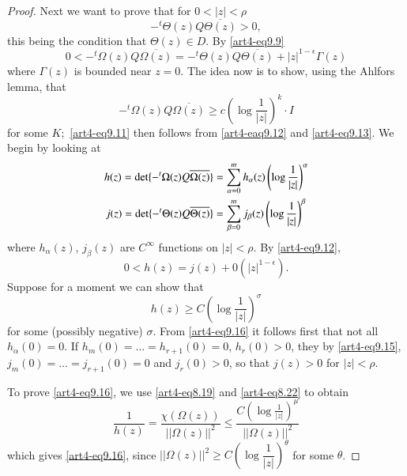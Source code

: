 \begin{proof}
Next we want to prove that for $0 < |z| < \rho$
\begin{equation}
-{}^t \Theta (z) Q \overline{\Theta (z)} > 0, \label{art4-eq9.11}
\end{equation}
this being the condition that $\Theta (z) \in D$. By \eqref{art4-eq9.9}
\begin{equation}
0 < -^t \Omega(z) Q \overline{\Omega(z)} = -^t \Theta (z) Q \overline{\Theta (z)}  + |z|^{1-\epsilon} \Gamma (z) 
\label{art4-eq9.12}
\end{equation}
where $\Gamma (z)$ is bounded near $z =0$. The idea now is to show, using the Ahlfors lemma, that
\begin{equation}
-^t \Omega(z) Q \overline{\Omega(z)} \geqslant c \left(\log \frac{1}{|z|} \right)^k\cdot I
\label{art4-eq9.13}
\end{equation}
for some $K;$ \eqref{art4-eq9.11} then follows from \eqref{art4-eaq9.12} and \eqref{art4-eq9.13}. We begin by looking at 
\begin{align}
 h (z) = \det \{-^t \Omega (z) Q \overline{\Omega (z)}\} & = \sum\limits^m_{\alpha = 0} h_\alpha (z) \left(\log \frac{1}{|z|} \right)^\alpha \notag\\
j(z) = \det \{-^t \Theta (z) Q \overline{\Theta (z)}\} & = \sum\limits^m_{\beta =0} j_\beta (z) \left(\log \frac{1}{|z|} \right)^\beta  \label{art4-eq9.14}
\end{align}
where $h_\alpha (z)$, $j_\beta (z)$ are $C^\infty$ functions on $|z| < \rho$. By \eqref{art4-eq9.12},
\begin{equation}
0 < h (z) = j (z) + 0 (|z|^{1-\epsilon}).
\label{eq9.15}
\end{equation}
Suppose for a moment we can show that
\begin{equation}
h (z) \geqslant C \left(\log \frac{1}{|z|} \right)^\sigma
\label{art4-eq9.16}
\end{equation}
for some (possibly negative) $\sigma$. From \eqref{art4-eq9.16} it follows first that not all $h_\alpha (0) = 0$. If $h_m(0) = \ldots = h_{r+1}(0) = 0$, $h_r(0) >0$, they by \eqref{art4-eq9.15}, $j_m (0)= \ldots = j_{r+1} (0) = 0$ and $j_r (0) > 0$, so that $j(z) > 0$ for $|z| < \rho$.

To prove \eqref{art4-eq9.16}, we use \eqref{art4-eq8.19} and \eqref{art4-eq8.22} to obtain
$$
\frac{1}{h(z)} = \frac{\chi (\Omega (z))}{||\Omega (z)||^2} \leqslant \frac{C \left(\log \frac{1}{|z|} \right)^\mu}{||\Omega (z)||^2}
$$
which gives \eqref{art4-eq9.16}, since $||\Omega (z)||^2 \geqslant C \left(\log \dfrac{1}{|z|} \right)^\theta$ for some $\theta$.


\end{proof}
